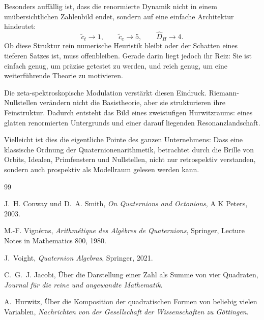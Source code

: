 \documentclass[a4paper,12pt]{article}
\theoremstyle{definition}
\numberwithin{equation}{section}
\begin{document}
	Besonders auffällig ist, dass die renormierte Dynamik nicht in einem unübersichtlichen Zahlenbild endet, sondern auf eine einfache Architektur hindeutet:
	\[
	\tilde c_t\to 1,\qquad
	\tilde c_e\to 5,\qquad
	\widehat D_H\to 4.
	\]
	Ob diese Struktur rein numerische Heuristik bleibt oder der Schatten eines tieferen Satzes ist, muss offenbleiben. Gerade darin liegt jedoch ihr Reiz: Sie ist einfach genug, um präzise getestet zu werden, und reich genug, um eine weiterführende Theorie zu motivieren.
	
	Die zeta-spektroskopische Modulation verstärkt diesen Eindruck. Riemann-Nullstellen verändern nicht die Basistheorie, aber sie strukturieren ihre Feinstruktur. Dadurch entsteht das Bild eines zweistufigen Hurwitzraums: eines glatten renormierten Untergrunds und einer darauf liegenden Resonanzlandschaft.
	
	Vielleicht ist dies die eigentliche Pointe des ganzen Unternehmens: Dass eine klassische Ordnung der Quaternionenarithmetik, betrachtet durch die Brille von Orbits, Idealen, Primfenstern und Nullstellen, nicht nur retrospektiv verstanden, sondern auch prospektiv als Modellraum gelesen werden kann.
	
	
	
	\begin{thebibliography}{99}
		
		J.~H. Conway und D.~A. Smith,
		\emph{On Quaternions and Octonions},
		A K Peters, 2003.
		
		M.-F. Vign\'eras,
		\emph{Arithm\'etique des Alg\`ebres de Quaternions},
		Springer, Lecture Notes in Mathematics 800, 1980.
		
		J.~Voight,
		\emph{Quaternion Algebras},
		Springer, 2021.
		
		C.~G.~J. Jacobi,
		Über die Darstellung einer Zahl als Summe von vier Quadraten,
		\emph{Journal für die reine und angewandte Mathematik}.
		
		A.~Hurwitz,
		Über die Komposition der quadratischen Formen von beliebig vielen Variablen,
		\emph{Nachrichten von der Gesellschaft der Wissenschaften zu Göttingen}.
		
	\end{thebibliography}
	
\end{document}
